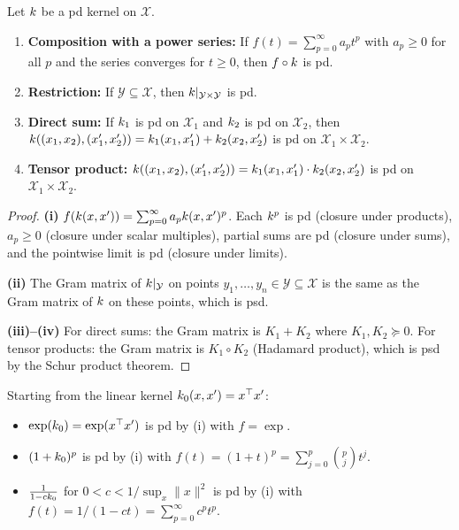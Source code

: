\documentclass[11pt,a4paper]{article}
\begin{document}
\begin{proposition}
\label{prop:additional-closure}
Let $k$ be a pd kernel on $\mathcal{X}$.
\begin{enumerate}[label=(\roman*)]
    \item \textbf{Composition with a power series:} If
    $f(t) = \sum_{p=0}^\infty a_p t^p$ with $a_p \ge 0$ for all $p$
    and the series converges for $t \ge 0$, then $f \circ k$
    is pd.
    \item \textbf{Restriction:} If $\mathcal{Y} \subseteq \mathcal{X}$,
    then $k|_{\mathcal{Y} \times \mathcal{Y}}$ is pd.
    \item \textbf{Direct sum:} If $k_1$ is pd on $\mathcal{X}_1$
    and $k_2$ is pd on $\mathcal{X}_2$, then $k((x_1, x_2),
    (x_1', x_2')) = k_1(x_1, x_1') + k_2(x_2, x_2')$ is
    pd on $\mathcal{X}_1 \times \mathcal{X}_2$.
    \item \textbf{Tensor product:} $k((x_1, x_2), (x_1', x_2'))
    = k_1(x_1, x_1') \cdot k_2(x_2, x_2')$ is pd on
    $\mathcal{X}_1 \times \mathcal{X}_2$.
\end{enumerate}
\end{proposition}

\begin{proof}
\textbf{(i)} $f(k(x,x')) = \sum_{p=0}^\infty a_p k(x,x')^p$.
Each $k^p$ is pd (closure under products), $a_p \ge 0$ (closure
under scalar multiples), partial sums are pd (closure under sums),
and the pointwise limit is pd (closure under limits).

\textbf{(ii)} The Gram matrix of $k|_\mathcal{Y}$ on points
$y_1, \ldots, y_n \in \mathcal{Y} \subseteq \mathcal{X}$ is the
same as the Gram matrix of $k$ on these points, which is psd.

\textbf{(iii)--(iv)} For direct sums: the Gram matrix is
$K_1 + K_2$ where $K_1, K_2 \succeq 0$. For tensor products:
the Gram matrix is $K_1 \circ K_2$ (Hadamard product), which is
psd by the Schur product theorem.
\end{proof}

\begin{example}
\label{ex:kernel-composition}
Starting from the linear kernel $k_0(x, x') = x^\top x'$:
\begin{itemize}
    \item $\exp(k_0) = \exp(x^\top x')$ is pd by (i) with
    $f = \exp$.
    \item $(1 + k_0)^p$ is pd by (i) with
    $f(t) = (1 + t)^p = \sum_{j=0}^p \binom{p}{j} t^j$.
    \item $\frac{1}{1 - c k_0}$ for $0 < c < 1/\sup_x \|x\|^2$
    is pd by (i) with $f(t) = 1/(1 - ct) = \sum_{p=0}^\infty c^p t^p$.
\end{itemize}
\end{example}
\end{document}
